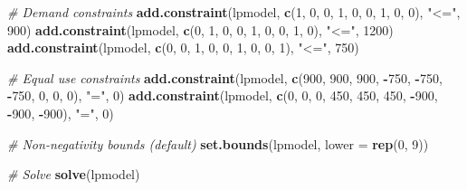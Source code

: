 \documentclass[
]{article}
\newenvironment{Shaded}{\begin{snugshade}}{\end{snugshade}}
\newcommand{\AttributeTok}[1]{\textcolor[rgb]{0.13,0.29,0.53}{#1}}
\newcommand{\CommentTok}[1]{\textcolor[rgb]{0.56,0.35,0.01}{\textit{#1}}}
\newcommand{\DecValTok}[1]{\textcolor[rgb]{0.00,0.00,0.81}{#1}}
\newcommand{\FunctionTok}[1]{\textcolor[rgb]{0.13,0.29,0.53}{\textbf{#1}}}
\newcommand{\NormalTok}[1]{#1}
\newcommand{\SpecialCharTok}[1]{\textcolor[rgb]{0.81,0.36,0.00}{\textbf{#1}}}
\newcommand{\StringTok}[1]{\textcolor[rgb]{0.31,0.60,0.02}{#1}}
\begin{document}
\begin{Shaded}
\begin{Highlighting}[]
\CommentTok{\# Demand constraints}
\FunctionTok{add.constraint}\NormalTok{(lpmodel, }\FunctionTok{c}\NormalTok{(}\DecValTok{1}\NormalTok{, }\DecValTok{0}\NormalTok{, }\DecValTok{0}\NormalTok{, }\DecValTok{1}\NormalTok{, }\DecValTok{0}\NormalTok{, }\DecValTok{0}\NormalTok{, }\DecValTok{1}\NormalTok{, }\DecValTok{0}\NormalTok{, }\DecValTok{0}\NormalTok{), }\StringTok{"\textless{}="}\NormalTok{, }\DecValTok{900}\NormalTok{)}
\FunctionTok{add.constraint}\NormalTok{(lpmodel, }\FunctionTok{c}\NormalTok{(}\DecValTok{0}\NormalTok{, }\DecValTok{1}\NormalTok{, }\DecValTok{0}\NormalTok{, }\DecValTok{0}\NormalTok{, }\DecValTok{1}\NormalTok{, }\DecValTok{0}\NormalTok{, }\DecValTok{0}\NormalTok{, }\DecValTok{1}\NormalTok{, }\DecValTok{0}\NormalTok{), }\StringTok{"\textless{}="}\NormalTok{, }\DecValTok{1200}\NormalTok{)}
\FunctionTok{add.constraint}\NormalTok{(lpmodel, }\FunctionTok{c}\NormalTok{(}\DecValTok{0}\NormalTok{, }\DecValTok{0}\NormalTok{, }\DecValTok{1}\NormalTok{, }\DecValTok{0}\NormalTok{, }\DecValTok{0}\NormalTok{, }\DecValTok{1}\NormalTok{, }\DecValTok{0}\NormalTok{, }\DecValTok{0}\NormalTok{, }\DecValTok{1}\NormalTok{), }\StringTok{"\textless{}="}\NormalTok{, }\DecValTok{750}\NormalTok{)}

\CommentTok{\# Equal use constraints}
\FunctionTok{add.constraint}\NormalTok{(lpmodel, }\FunctionTok{c}\NormalTok{(}\DecValTok{900}\NormalTok{, }\DecValTok{900}\NormalTok{, }\DecValTok{900}\NormalTok{, }\SpecialCharTok{{-}}\DecValTok{750}\NormalTok{, }\SpecialCharTok{{-}}\DecValTok{750}\NormalTok{, }\SpecialCharTok{{-}}\DecValTok{750}\NormalTok{, }\DecValTok{0}\NormalTok{, }\DecValTok{0}\NormalTok{, }\DecValTok{0}\NormalTok{), }\StringTok{"="}\NormalTok{, }\DecValTok{0}\NormalTok{)}
\FunctionTok{add.constraint}\NormalTok{(lpmodel, }\FunctionTok{c}\NormalTok{(}\DecValTok{0}\NormalTok{, }\DecValTok{0}\NormalTok{, }\DecValTok{0}\NormalTok{, }\DecValTok{450}\NormalTok{, }\DecValTok{450}\NormalTok{, }\DecValTok{450}\NormalTok{, }\SpecialCharTok{{-}}\DecValTok{900}\NormalTok{, }\SpecialCharTok{{-}}\DecValTok{900}\NormalTok{, }\SpecialCharTok{{-}}\DecValTok{900}\NormalTok{), }\StringTok{"="}\NormalTok{, }\DecValTok{0}\NormalTok{)}

\CommentTok{\# Non{-}negativity bounds (default)}
\FunctionTok{set.bounds}\NormalTok{(lpmodel, }\AttributeTok{lower =} \FunctionTok{rep}\NormalTok{(}\DecValTok{0}\NormalTok{, }\DecValTok{9}\NormalTok{))}

\CommentTok{\# Solve}
\FunctionTok{solve}\NormalTok{(lpmodel)}
\end{Highlighting}
\end{Shaded}
\end{document}
